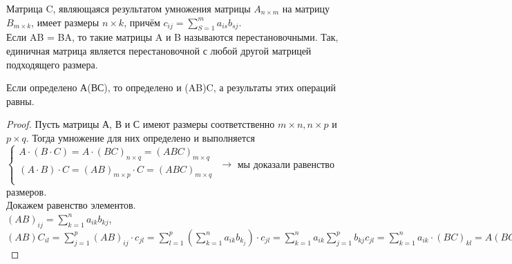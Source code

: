 	Матрица C, являющаяся результатом умножения матрицы $A_{n \times m}$ на матрицу $B_{m \times k}$, имеет размеры $n \times k$, причём $c_{ij} = \sum_{S = 1}^{m} a_{is}b_{sj}$.\\
	
	Если AB = BA, то такие матрицы A и B называются $\textit{перестановочными}$. Так, единичная матрица является перестановочной с любой другой матрицей подходящего размера.
	
	\begin{theorem}
		Если определено А(ВС), то определено и (AB)C, а результаты этих операций равны.
	\end{theorem}
	\begin{proof}
		Пусть матрицы А, В и С имеют размеры соответственно $m \times n, n \times p$ и $p \times q$. Тогда умножение для них определено и выполняется\\
		
		$\begin{cases}
			A \cdot (B \cdot C) = A \cdot (BC)_{n \times q} = (ABC)_{m \times q}\\
			(A \cdot B) \cdot C = (AB)_{m \times p} \cdot C = (ABC)_{m \times q}\\
		\end{cases}$ $\longrightarrow$ мы доказали равенство размеров.\\
		Докажем равенство элементов.\\
		$(AB)_{ij} = \sum_{k = 1}^{n} a_{ik}b_{kj}$, $(AB)C_{il} = \sum_{j = 1}^{p} (AB)_{ij} \cdot c_{jl} = \sum_{l = 1}^{p}(\sum_{k = 1}^{n} a_{ik}b_{k_j}) \cdot c_{jl} = \sum_{k = 1}^{n} a_{ik} \sum_{j = 1}^{p} b_{kj}c_{jl} = \sum_{k = 1}^{n} a_{ik} \cdot (BC)_{kl} = A(BC)_{il}$
	\end{proof}